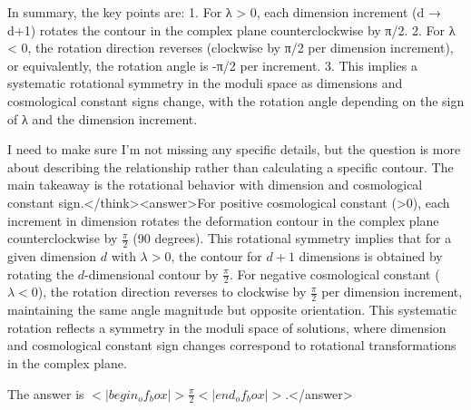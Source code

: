 In summary, the key points are: 
1. For λ > 0, each dimension increment (d → d+1) rotates the contour in the complex plane counterclockwise by π/2.
2. For λ < 0, the rotation direction reverses (clockwise by π/2 per dimension increment), or equivalently, the rotation angle is -π/2 per increment.
3. This implies a systematic rotational symmetry in the moduli space as dimensions and cosmological constant signs change, with the rotation angle depending on the sign of λ and the dimension increment.

I need to make sure I'm not missing any specific details, but the question is more about describing the relationship rather than calculating a specific contour. The main takeaway is the rotational behavior with dimension and cosmological constant sign.</think><answer>For positive cosmological constant (>0), each increment in dimension rotates the deformation contour in the complex plane counterclockwise by \( \frac{\pi}{2} \) (90 degrees). This rotational symmetry implies that for a given dimension \( d \) with \( \lambda > 0 \), the contour for \( d+1 \) dimensions is obtained by rotating the \( d \)-dimensional contour by \( \frac{\pi}{2} \). For negative cosmological constant (\( \lambda < 0 \)), the rotation direction reverses to clockwise by \( \frac{\pi}{2} \) per dimension increment, maintaining the same angle magnitude but opposite orientation. This systematic rotation reflects a symmetry in the moduli space of solutions, where dimension and cosmological constant sign changes correspond to rotational transformations in the complex plane.  

The answer is \(<|begin_of_box|>\frac{\pi}{2}<|end_of_box|>\).</answer>